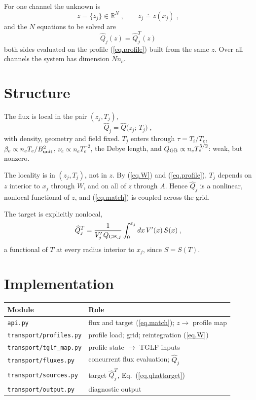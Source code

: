 \documentclass[12pt]{article}
\newcommand\qgb{Q_{\rm GB}}
\newcommand\qgbj{Q_{{\rm GB},j}}
\newcommand\vpr{V^\prime}
\newcommand\qhat{\widehat{Q}}
\begin{document}
For one channel the unknown is
%
\begin{equation}
z = \{ z_j \} \in \mathbb{R}^{N} \; ,
\qquad
z_j \doteq z(x_j) \; ,
\end{equation}
%
and the $N$ equations to be solved are
%
\begin{equation}
\boxed{\;
\qhat_j(z) = \qhat^T_j(z) \; }
\label{eq.match}
\end{equation}
%
both sides evaluated on the profile (\ref{eq.profile}) built from the
same $z$.  Over all channels the system has dimension $N n_c$.

\section{Structure}
\label{sec.structure}

The flux is local in the pair $(z_j,T_j)$,
%
\begin{equation}
\qhat_j = \qhat \bigl( z_j ;\, T_j \bigr) \; ,
\label{eq.localflux}
\end{equation}
%
with density, geometry and field fixed.  $T_j$ enters through $\tau =
T_i/T_e$, $\beta_e \propto n_e T_e/B_{\rm unit}^2$, $\nu_e \propto n_e
T_e^{-2}$, the Debye length, and $\qgb \propto n_e T_e^{5/2}$: weak, but
nonzero.

The locality is in $(z_j,T_j)$, not in $z$.  By (\ref{eq.W}) and
(\ref{eq.profile}), $T_j$ depends on $z$ interior to $x_j$ through $W$,
and on all of $z$ through $A$.  Hence $\qhat_j$ is a nonlinear, nonlocal
functional of $z$, and (\ref{eq.match}) is coupled across the grid.

The target is explicitly nonlocal,
%
\begin{equation}
\qhat^T_j = \frac{1}{\vpr_j \, \qgbj}
 \int_0^{x_j} dx \, \vpr(x) \, S(x) \; ,
\label{eq.nonlocaltarget}
\end{equation}
%
a functional of $T$ at every radius interior to $x_j$, since $S = S(T)$.

\section{Implementation}

\begin{center}
\begin{tabular}{ll}
\toprule
Module & Role \\
\midrule
\verb|api.py|                & flux and target (\ref{eq.match}); $z \to$ profile map \\
\verb|transport/profiles.py| & profile load; grid; reintegration (\ref{eq.W}) \\
\verb|transport/tglf_map.py| & profile state $\to$ TGLF inputs \\
\verb|transport/fluxes.py|   & concurrent flux evaluation; $\qhat_j$ \\
\verb|transport/sources.py|  & target $\qhat^T_j$, Eq.~(\ref{eq.qhattarget}) \\
\verb|transport/output.py|   & diagnostic output \\
\bottomrule
\end{tabular}
\end{center}
\end{document}
